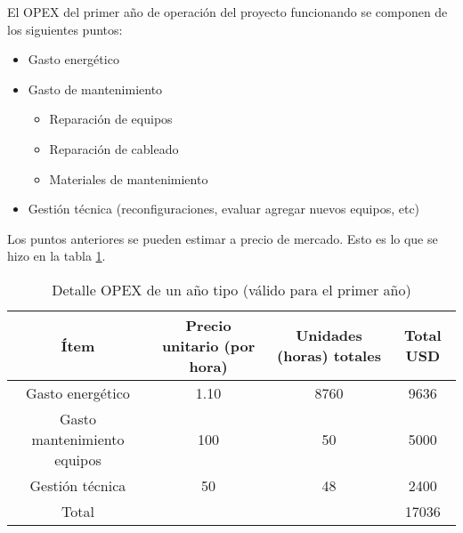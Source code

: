 El OPEX del primer año de operación del proyecto funcionando se
componen de los siguientes puntos:
\begin{itemize}
\item Gasto energético
\item Gasto de mantenimiento
  \begin{itemize}
  \item Reparación de equipos
  \item Reparación de cableado
  \item Materiales de mantenimiento
  \end{itemize}
\item Gestión técnica (reconfiguraciones, evaluar agregar nuevos
  equipos, etc)
\end{itemize}

Los puntos anteriores se pueden estimar a precio de mercado. Esto es
lo que se hizo en la tabla \ref{tab:opex}.

\begin{table}[H]
  \centering
  \begin{tabular}{| c | c | c | c |}
    \hline{}
    Ítem & Precio unitario (por hora) & Unidades (horas) totales & Total USD \\
    \hline{}
    Gasto energético & 1.10 & 8760 & 9636 \\
    \hline{}
    Gasto mantenimiento equipos & 100 & 50 & 5000 \\
    \hline{}
    Gestión técnica & 50 & 48 & 2400 \\
    \hline{}
    Total & & & 17036 \\
    \hline
  \end{tabular}
  \caption{Detalle OPEX de un año tipo (válido para el primer año)}
  \label{tab:opex}
\end{table}